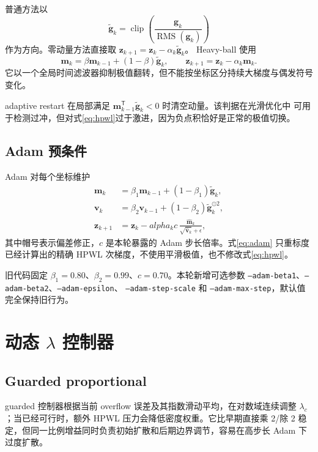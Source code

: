 \documentclass[UTF8,fontset=windows,a4paper,11pt]{ctexart}
\newcommand{\rms}{\operatorname{RMS}}
\newcommand{\code}[1]{\texttt{#1}}
\begin{document}
普通方法以
\begin{equation}
 \widetilde{\bm g}_k=\operatorname{clip}
 \left(\frac{\bm g_k}{\rms(\bm g_k)}\right)
\end{equation}
作为方向。零动量方法直接取 $\bm z_{k+1}=\bm z_k-\alpha_k\widetilde{\bm g}_k$。
Heavy-ball 使用
\begin{equation}
 \bm m_k=\beta\bm m_{k-1}+(1-\beta)\widetilde{\bm g}_k,
 \qquad \bm z_{k+1}=\bm z_k-\alpha_k\bm m_k.
 \label{eq:hb}
\end{equation}
它以一个全局时间滤波器抑制极值翻转，但不能按坐标区分持续大梯度与偶发符号变化。

adaptive restart 在局部满足
$\bm m_{k-1}^{\mathsf T}\widetilde{\bm g}_k<0$ 时清空动量。该判据在光滑优化中
可用于检测过冲，但对式\eqref{eq:hpwl}过于激进，因为负点积恰好是正常的极值切换。

\subsection{Adam 预条件}

Adam 对每个坐标维护
\begin{align}
 \bm m_k&=\beta_1\bm m_{k-1}+(1-\beta_1)\widetilde{\bm g}_k,\\
 \bm v_k&=\beta_2\bm v_{k-1}+(1-\beta_2)
              \widetilde{\bm g}_k^{\odot2},\\
 \bm z_{k+1}&=\bm z_k-alpha_k c\,
 \frac{\widehat{\bm m}_k}{\sqrt{\widehat{\bm v}_k}+\epsilon},
 \label{eq:adam}
\end{align}
其中帽号表示偏差修正，$c$ 是本轮暴露的 Adam 步长倍率。式\eqref{eq:adam}
只重标度已经计算出的精确 HPWL 次梯度，不使用平滑极值，也不修改式\eqref{eq:hpwl}。

旧代码固定 $\beta_1=0.80$、$\beta_2=0.99$、$c=0.70$。本轮新增可选参数
\code{--adam-beta1}、\code{--adam-beta2}、\code{--adam-epsilon}、
\code{--adam-step-scale} 和 \code{--adam-max-step}，默认值完全保持旧行为。

\section{动态 \texorpdfstring{$\lambda$}{lambda} 控制器}

\subsection{Guarded proportional}

guarded 控制器根据当前 overflow 误差及其指数滑动平均，在对数域连续调整
$\lambda_c$；当已经可行时，额外 HPWL 压力会降低密度权重。它比早期直接乘 2/除 2
稳定，但同一比例增益同时负责初始扩散和后期边界调节，容易在高步长 Adam 下过度扩散。
\end{document}
